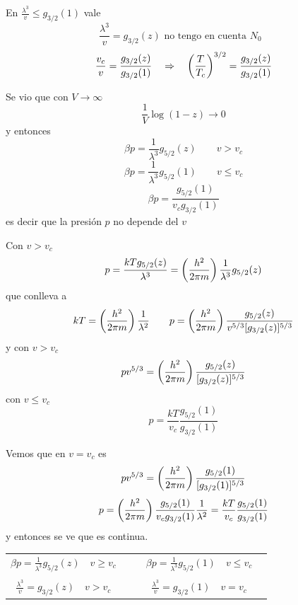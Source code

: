 \documentclass[10pt,oneside]{CBFT_book}
\begin{document}
En $ \frac{\lambda^3}{v} \leq g_{3/2}(1) $ vale 
\[
	\frac{\lambda^3}{v} = g_{3/2}(z) \text{ no tengo en cuenta $N_0$ }
\]
\[
	\frac{v_c}{v} = \frac{ g_{3/2}(z) }{ g_{3/2}(1) } \quad \Rightarrow \quad 
	\left( \frac{ T }{ T_c } \right)^{3/2} = \frac{ g_{3/2}(z) }{ g_{3/2}(1) } 
\]

Se vio que con $ V \to \infty $
\[
	\frac{1}{V} \log (1-z) \to 0 
\]
y entonces 
\[
	\beta p = \frac{1}{\lambda^3} g_{5/2}(z) \qquad v > v_c
\]
\[
	\beta p = \frac{1}{\lambda^3} g_{5/2}(1) \qquad v \leq v_c
\]
\[
	\beta p = \frac{ g_{5/2}(1) }{ v_c g_{3/2}(1) }
\]
es decir que la presión $p$ no depende del $v$

Con $v > v_c$ 
\[
	p = \frac{ k T g_{5/2}(z) }{\lambda^3} = \left( \frac{ h^2 }{  2\pi m  } \right) \frac{1}{\lambda^3} g_{5/2}(z)
\]
que conlleva a 
\[
	kT = \left( \frac{ h^2 }{  2\pi m  } \right) \frac{1}{\lambda^2} \qquad 
	p =  \left( \frac{ h^2 }{  2\pi m  } \right) \frac{ g_{5/2}(z) }{ v^{5/3} [ g_{3/2}(z) ]^{5/3} }
\]
y con $v > v_c$ 
\[
	pv^{5/3} = \left( \frac{ h^2 }{  2\pi m  } \right) \frac{ g_{5/2}(z) }{ [ g_{3/2}(z) ]^{5/3} }
\]
con $v \leq v_c$ 
\[
	p = \frac{ k T }{ v_c } \frac{ g_{5/2}(1) }{ g_{3/2}(1) }
\]

Vemos que en $ v = v_c $ es
\[
	pv^{5/3} = \left( \frac{ h^2 }{  2\pi m  } \right) \frac{ g_{5/2}(1) }{ [ g_{3/2}(1) ]^{5/3} }
\]
\[
	p = \left( \frac{ h^2 }{  2\pi m  } \right) \frac{ g_{5/2}(1) }{ v_c g_{3/2}(1) }\frac{1}{\lambda^2} =
	\frac{kT}{v_c}\frac{ g_{5/2}(1) }{ g_{3/2}(1) }
\]
y entonces se ve que es continua.

\begin{center}
\begin{tabular}{c|c}
 $\displaystyle \beta p = \frac{1}{\lambda^3} g_{5/2}(z) \quad v \geq v_c \quad $ & 
 $\displaystyle \quad \beta p = \frac{1}{\lambda^3} g_{5/2}(1) \quad v \leq v_c \quad $\\
 & \\
 $\displaystyle \frac{\lambda^3}{v} = g_{3/2}(z) \quad v > v_c \quad $ 
 & $\displaystyle \quad \frac{\lambda^3}{v} = g_{3/2}(1) \quad v = v_c \quad $
\end{tabular}
\end{center}
\end{document}
